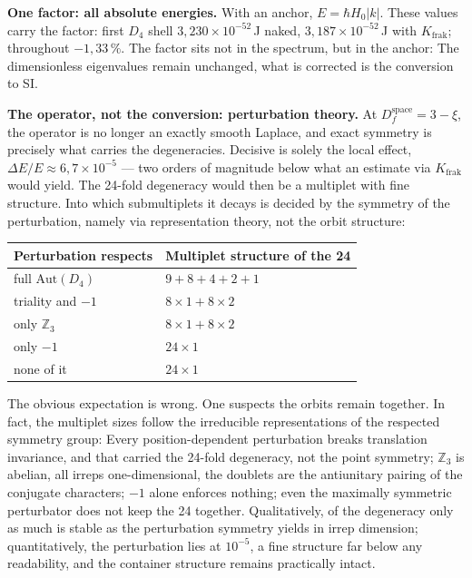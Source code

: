 \textbf{One factor: all absolute energies.} With an anchor,
$E = \hbar H_0|k|$. These values carry the factor: first $D_4$ shell
$3{,}230\times10^{-52}$\,J naked, $3{,}187\times10^{-52}$\,J with
$K_{\mathrm{frak}}$; throughout $-1{,}33\,\%$. The factor sits not in the
spectrum, but in the anchor: The dimensionless eigenvalues remain
unchanged, what is corrected is the conversion to SI.

\textbf{The operator, not the conversion: perturbation theory.} At
$D_f^{\mathrm{space}} = 3-\xi$, the operator is no longer an exactly smooth
Laplace, and exact symmetry is precisely what carries the degeneracies. Decisive is solely the local effect, $\Delta E/E\approx
6{,}7\times10^{-5}$ --- two orders of magnitude below what an estimate via
$K_{\mathrm{frak}}$ would yield. The 24-fold degeneracy
would then be a multiplet with fine structure. Into which submultiplets it
decays is decided by the symmetry of the perturbation, namely via
representation theory, not the orbit structure:

\begin{center}
\small
\begin{tabular}{lp{3.6cm}}
\toprule
Perturbation respects & Multiplet structure of the 24 \\
\midrule
full $\mathrm{Aut}(D_4)$ & $9+8+4+2+1$ \\
triality and $-1$ & $8\times1+8\times2$ \\
only $\mathbb{Z}_3$ & $8\times1+8\times2$ \\
only $-1$ & $24\times1$ \\
none of it & $24\times1$ \\
\bottomrule
\end{tabular}
\end{center}

The obvious expectation is wrong. One suspects the orbits remain
together. In fact, the multiplet sizes follow the irreducible
representations of the respected symmetry group: Every position-dependent
perturbation breaks translation invariance, and that carried the
24-fold degeneracy, not the point symmetry; $\mathbb{Z}_3$ is abelian, all
irreps one-dimensional, the doublets are the antiunitary pairing of the
conjugate characters; $-1$ alone enforces nothing; even the
maximally symmetric perturbator does not keep the 24 together. Qualitatively,
of the degeneracy only as much is stable as the perturbation symmetry
yields in irrep dimension; quantitatively, the perturbation lies at $10^{-5}$,
a fine structure far below any readability, and the
container structure remains practically intact.

